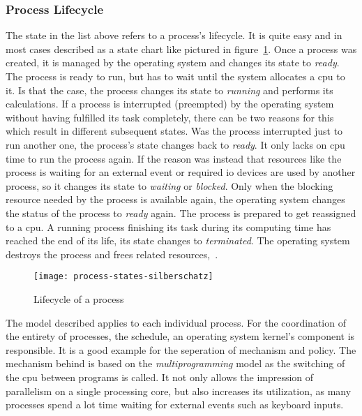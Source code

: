 \subsubsection*{Process Lifecycle}
The state in the list above refers to a process's lifecycle.
It is quite easy and in most cases described as a state chart like pictured in figure~\ref{pic:process-lifecycle}.
Once a process was created, it is managed by the operating system and changes its state to \textit{ready}.
The process is ready to run, but has to wait until the system allocates a \ac{cpu} to it.
Is that the case, the process changes its state to \textit{running} and performs its calculations.
If a process is interrupted (preempted) by the operating system without having fulfilled its task completely, there can be two reasons for this which result in different subsequent states.
Was the process interrupted just to run another one, the process's state changes back to \textit{ready}. 
It only lacks on \ac{cpu} time to run the process again.
If the reason was instead that resources like the process is waiting for an external event or required \ac{io} devices are used by another process, so it changes its state to \textit{waiting} or \textit{blocked}. 
Only when the blocking resource needed by the process is available again, the operating system changes the status of the process to \textit{ready} again.
The process is prepared to get reassigned to a \ac{cpu}.
A running process finishing its task during its computing time has reached the end of its life, its state changes to \textit{terminated}.
The operating system destroys the process and frees related resources\cite{silberschatz2009operating},~\cite{mandl2014Grundkurs}.

\begin{figure} [ht]
	\centering
	\texttt{[image: process-states-silberschatz]}
    \caption{Lifecycle of a process\label{pic:process-lifecycle}\cite{silberschatz2009operating}}
\end{figure}

The model described applies to each individual process.
For the coordination of the entirety of processes, the schedule, an operating system kernel's component is responsible.
It is a good example for the seperation of mechanism and policy.
The mechanism behind is based on the \textit{multiprogramming} model as the switching of the \ac{cpu} between programs is called.
It not only allows the impression of parallelism on a single processing core, but also increases its utilization, as many processes spend a lot time waiting for external events such as keyboard inputs\cite{tanenbaum-modern-operating-systems}.

